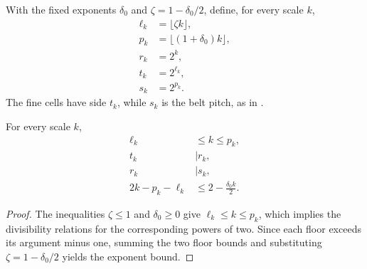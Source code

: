 \begin{definition}
    \label{def:area_law_fine_belt_scales}
    \leanok
    With the fixed exponents $\delta_0$ and $\zeta=1-\delta_0/2$, define,
    for every scale $k$,
    \begin{align}
        \ell_k & =\lfloor\zeta k\rfloor,       \\
        p_k    & =\lfloor(1+\delta_0)k\rfloor, \\
        r_k    & =2^k,                         \\
        t_k    & =2^{\ell_k},                  \\
        s_k    & =2^{p_k}.
    \end{align}
    The fine cells have side $t_k$, while $s_k$ is the belt pitch, as in
    \cite[Section~11]{OpenAI2026AreaLaw}.
\end{definition}

\begin{lemma}
    \label{thm:area_law_fine_belt_scales}
    \leanok
    For every scale $k$,
    \begin{align}
        \ell_k        & \le k\le p_k,              \\
        t_k           & \mid r_k,                  \\
        r_k           & \mid s_k,                  \\
        2k-p_k-\ell_k & \le2-\frac{\delta_0 k}{2}.
    \end{align}
\end{lemma}
\begin{proof}\leanok
    The inequalities $\zeta\le1$ and $\delta_0\ge0$ give $\ell_k\le k\le p_k$,
    which implies the divisibility relations for the corresponding powers of two.
    Since each floor exceeds its argument minus one, summing the two floor
    bounds and substituting $\zeta=1-\delta_0/2$ yields the exponent bound.
\end{proof}

